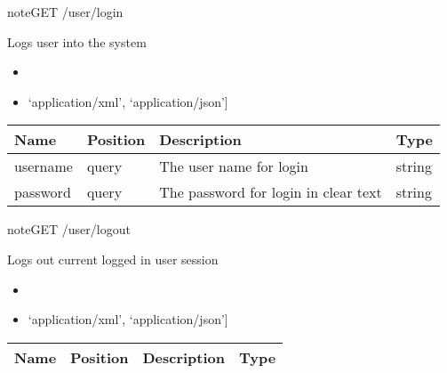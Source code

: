 \documentclass[letterpaper,10pt,english]{sphinxmanual}
\begin{document}
\begin{sphinxadmonition}{note}{GET /user/login}

Logs user into the system\begin{itemize}
\item {} 

\item {} 
\sphinxstylestrong{Produces: 
}{[}‘application/xml’, ‘application/json’{]}

\end{itemize}




\begin{savenotes}\sphinxattablestart
\centering
\begin{tabulary}{\linewidth}[t]{|T|T|T|T|}
\hline
\sphinxstyletheadfamily 
Name
&\sphinxstyletheadfamily 
Position
&\sphinxstyletheadfamily 
Description
&\sphinxstyletheadfamily 
Type
\\
\hline
username
&
query
&
The user name for login
&
string
\\
\hline
password
&
query
&
The password for login in clear text
&
string
\\
\hline
\end{tabulary}
\par
\sphinxattableend\end{savenotes}



\end{sphinxadmonition}

\begin{sphinxadmonition}{note}{GET /user/logout}

Logs out current logged in user session\begin{itemize}
\item {} 

\item {} 
\sphinxstylestrong{Produces: 
}{[}‘application/xml’, ‘application/json’{]}

\end{itemize}




\begin{savenotes}\sphinxattablestart
\centering
\begin{tabulary}{\linewidth}[t]{|T|T|T|T|}
\hline
\sphinxstyletheadfamily 
Name
&\sphinxstyletheadfamily 
Position
&\sphinxstyletheadfamily 
Description
&\sphinxstyletheadfamily 
Type
\\
\hline
\end{tabulary}
\par
\sphinxattableend\end{savenotes}


\end{sphinxadmonition}
\end{document}
